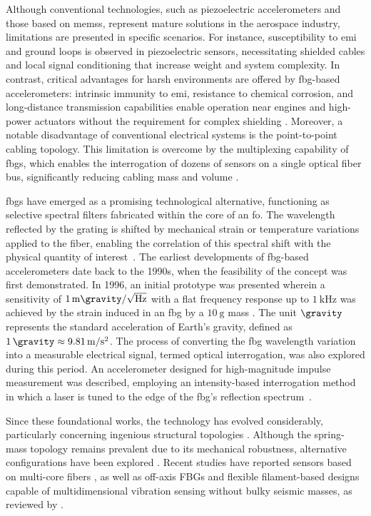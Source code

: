 \documentclass[sensors,article,accept,pdftex,moreauthors]{Definitions/mdpi}
\begin{document}
Although conventional technologies, such as piezoelectric accelerometers and those based on \glspl{mems}, represent mature solutions in the aerospace industry, limitations are presented in specific scenarios. For instance, susceptibility to \gls{emi} and ground loops is observed in piezoelectric sensors, necessitating shielded cables and local signal conditioning that increase weight and system complexity. In contrast, critical advantages for harsh environments are offered by \gls{fbg}-based accelerometers: intrinsic immunity to \gls{emi}, resistance to chemical corrosion, and long-distance transmission capabilities enable operation near engines and high-power actuators without the requirement for complex shielding \citep{Guo2021}. Moreover, a notable disadvantage of conventional electrical systems is the point-to-point cabling topology. This limitation is overcome by the multiplexing capability of \glspl{fbg}, which enables the interrogation of dozens of sensors on a single optical fiber bus, significantly reducing cabling mass and volume \citep{Kashyap2010}.


\Glspl{fbg} have emerged as a promising technological alternative, functioning as selective spectral filters fabricated within the core of an \gls{fo}. The wavelength reflected by the grating is shifted by mechanical strain or temperature variations applied to the fiber, enabling the correlation of this spectral shift with the physical quantity of interest~\citep{Kashyap2010}. The earliest developments of \gls{fbg}-based accelerometers date back to the 1990s, when the feasibility of the concept was first demonstrated. In 1996, an initial prototype was presented wherein a sensitivity of $\SI{1}{\milli\gravity\per\sqrt{\text{\hertz}}}$ with a flat frequency response up to $\SI{1}{\kilo\hertz}$ was achieved by the strain induced in an \gls{fbg} by a $\SI{10}{\gram}$ mass \citep{Berkoff1996}. The unit $\si{\gravity}$ represents the standard acceleration of Earth's gravity, defined as $\SI{1}{\gravity} \approx \SI{9.81}{\meter\per\second\squared}$. The process of converting the \gls{fbg} wavelength variation into a measurable electrical signal, termed optical interrogation, was also explored during this period. An accelerometer designed for high-magnitude impulse measurement was described, employing an intensity-based interrogation method in which a laser is tuned to the edge of the \gls{fbg}'s reflection spectrum~\citep{Theriault1996}.



Since these foundational works, the technology has evolved considerably, particularly concerning ingenious structural topologies \citep{cao2025,chen2025,VelazquezCarreon2026,Qiu2025,Liu2025,zhang2025,wang2025,duan2024,zhang2025inclined,fan2025,teng2024a,li2024a,Zhang2024,Qiu2023}. Although the spring-mass topology remains prevalent due to its mechanical robustness, alternative configurations have been explored \citep{Wang2023}. Recent studies have reported sensors based on multi-core fibers \citep{Zhou2021}, as well as off-axis FBGs and flexible filament-based designs capable of multidimensional vibration sensing without bulky seismic masses, as reviewed by \citet{Guo2021}.
\end{document}
